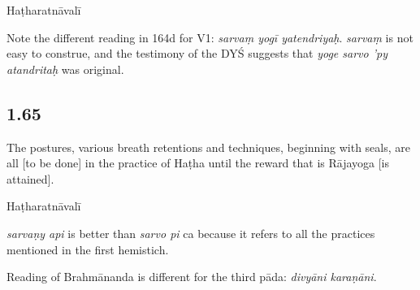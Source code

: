 \begin{ekdosis}
\begin{testimonia}[hp01_064]
Haṭharatnāvalī

\begin{versinnote}
\end{versinnote}

\end{testimonia}

\begin{philcomm}[hp01_064]
Note the different reading in 164d for V1: \emph{sarvaṃ yogī yatendriyaḥ}. \emph{sarvaṃ} is not easy to construe, and the testimony of the DYŚ suggests that \emph{yoge sarvo ’py atandritaḥ} was original.
\end{philcomm}

\subsection*{1.65}
\begin{translation}[hp01_065]
The postures, various breath retentions and techniques, beginning with seals, are all [to be done] in the practice of Haṭha until the reward that is Rājayoga [is attained].
\end{translation}

\begin{sources}[hp01_065]
\end{sources}

\begin{testimonia}[hp01_065]
Haṭharatnāvalī

\begin{versinnote}
\end{versinnote}

\end{testimonia}

\begin{philcomm}[hp01_065]
\emph{sarvaṇy api} is better than \emph{sarvo pi} ca because it refers to all the practices mentioned in the first hemistich.

Reading of Brahmānanda is different for the third pāda: \emph{divyāni karaṇāni}.
\end{philcomm}

\end{ekdosis}

